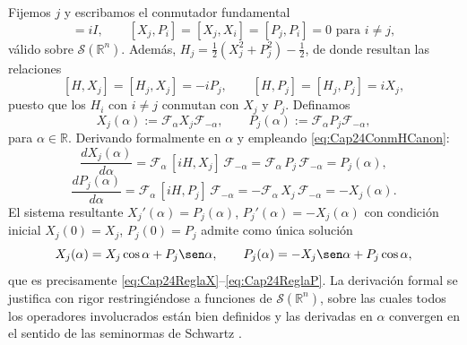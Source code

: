             \begin{Proof}
                Fijemos $j$ y escribamos el conmutador fundamental
                \begin{equation*}
                    [X_j, P_j] = iI, \qquad [X_j, P_i] = [X_j, X_i] = [P_j, P_i] = 0 \text{ para } i\neq j,
                \end{equation*}
                válido sobre $\mathcal{S}(\mathbb{R}^n)$. Además, $H_j = \tfrac12(X_j^2 + P_j^2) - \tfrac12$, de donde resultan las relaciones
                \begin{equation}\label{eq:Cap24ConmHCanon}
                    [H, X_j] = [H_j, X_j] = -iP_j, \qquad [H, P_j] = [H_j, P_j] = i X_j,
                \end{equation}
                puesto que los $H_i$ con $i\neq j$ conmutan con $X_j$ y $P_j$. Definamos
                \begin{equation*}
                    X_j(\alpha) := \mathcal{F}_\alpha X_j \mathcal{F}_{-\alpha},\qquad P_j(\alpha) := \mathcal{F}_\alpha P_j \mathcal{F}_{-\alpha},
                \end{equation*}
                para $\alpha\in\mathbb{R}$. Derivando formalmente en $\alpha$ y empleando \eqref{eq:Cap24ConmHCanon}:
                \begin{equation*}
                    \frac{dX_j(\alpha)}{d\alpha} = \mathcal{F}_\alpha\,[iH, X_j]\,\mathcal{F}_{-\alpha} = \mathcal{F}_\alpha\,P_j\,\mathcal{F}_{-\alpha} = P_j(\alpha),
                \end{equation*}
                \begin{equation*}
                    \frac{dP_j(\alpha)}{d\alpha} = \mathcal{F}_\alpha\,[iH, P_j]\,\mathcal{F}_{-\alpha} = -\mathcal{F}_\alpha\,X_j\,\mathcal{F}_{-\alpha} = -X_j(\alpha).
                \end{equation*}
                El sistema resultante $X_j'(\alpha) = P_j(\alpha)$, $P_j'(\alpha) = -X_j(\alpha)$ con condición inicial $X_j(0)=X_j$, $P_j(0)=P_j$ admite como única solución
                \begin{equation*}
                    X_j(\alpha) = X_j\cos\alpha + P_j\sen\alpha,\qquad P_j(\alpha) = -X_j\sen\alpha + P_j\cos\alpha,
                \end{equation*}
                que es precisamente \eqref{eq:Cap24ReglaX}--\eqref{eq:Cap24ReglaP}. La derivación formal se justifica con rigor restringiéndose a funciones de $\mathcal{S}(\mathbb{R}^n)$, sobre las cuales todos los operadores involucrados están bien definidos y las derivadas en $\alpha$ convergen en el sentido de las seminormas de Schwartz \citep[Ch. X]{reed1980methods}.
            \end{Proof}

